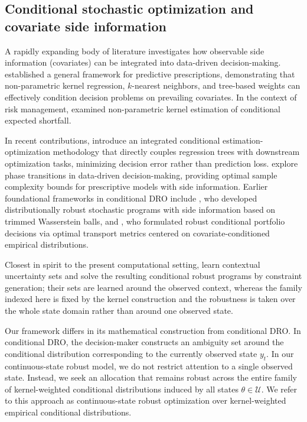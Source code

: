 \documentclass[smallextended]{svjour3}
\begin{document}
\subsection{Conditional stochastic optimization and covariate side information}
A rapidly expanding body of literature investigates how observable side information (covariates) can be integrated into data-driven decision-making. \cite{bertsimas2020predictive} established a general framework for predictive prescriptions, demonstrating that non-parametric kernel regression, $k$-nearest neighbors, and tree-based weights can effectively condition decision problems on prevailing covariates. In the context of risk management, \cite{scaillet2004nonparametric} examined non-parametric kernel estimation of conditional expected shortfall.

In recent contributions, \cite{qi2026integrated} introduce an integrated conditional estimation-optimization methodology that directly couples regression trees with downstream optimization tasks, minimizing decision error rather than prediction loss. \cite{bennouna2025learning} explore phase transitions in data-driven decision-making, providing optimal sample complexity bounds for prescriptive models with side information. Earlier foundational frameworks in conditional DRO include \cite{esteban2022distributionally}, who developed distributionally robust stochastic programs with side information based on trimmed Wasserstein balls, and \cite{nguyen2025robustifying}, who formulated robust conditional portfolio decisions via optimal transport metrics centered on covariate-conditioned empirical distributions.

Closest in spirit to the present computational setting, \cite{chenreddy2022conditional} learn contextual uncertainty sets and solve the resulting conditional robust programs by constraint generation; their sets are learned around the observed context, whereas the family indexed here is fixed by the kernel construction and the robustness is taken over the whole state domain rather than around one observed state.

Our framework differs in its mathematical construction from conditional DRO. In conditional DRO, the decision-maker constructs an ambiguity set around the conditional distribution corresponding to the currently observed state $y_t$. In our continuous-state robust model, we do not restrict attention to a single observed state. Instead, we seek an allocation that remains robust across the entire family of kernel-weighted conditional distributions induced by all states $\theta \in \mathcal{U}$. We refer to this approach as continuous-state robust optimization over kernel-weighted empirical conditional distributions.
\end{document}
